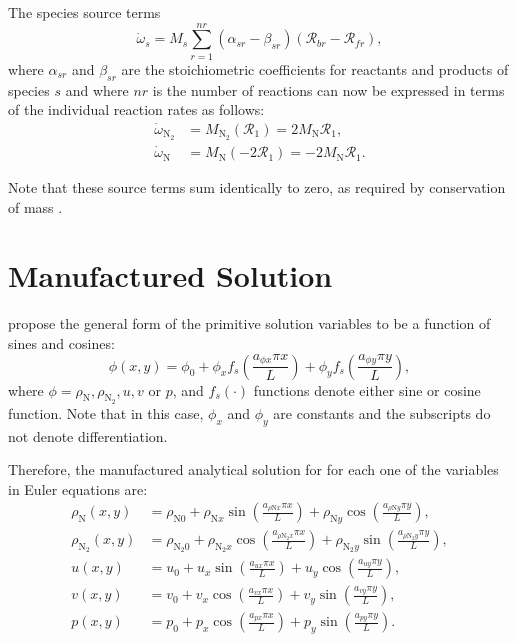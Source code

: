 \documentclass[10pt]{article}
\begin{document}
The species source terms \begin{equation}
  \dot{\omega}_s = M_s \sum_{r=1}^{nr}\left(\alpha_{sr}-\beta_{sr}\right)\left(\mathcal{R}_{br} - \mathcal{R}_{fr}\right),
\end{equation}
where $\alpha_{sr}$ and $\beta_{sr}$ are the stoichiometric coefficients for reactants and products of species $s$ and where $nr$ is the number of reactions can now be expressed in terms of the individual reaction rates as follows:
\begin{align*}
 \dot{\omega}_{\text{N}_2} &= M_{\text{N}_2}\left(\mathcal{R}_1\right)= 2 M_\text{N} \mathcal{R}_1 ,\\
 \dot{\omega}_{\text{N}} &= M_{\text{N}}\left(-2\mathcal{R}_1 \right)=-2 M_\text{N} \mathcal{R}_1. 
\end{align*}

Note that these source terms sum identically to zero, as required by conservation of mass  \citep{Kessler2004}.


\section{Manufactured Solution}

\citet{Roy2002} propose the general form of the primitive solution variables to be a function of sines and cosines:
\begin{equation}
 \label{eq:manufactured01}
 \phi (x,y) = \phi_0+ \phi_x f_s\left(\frac{a_{\phi x} \pi x}{L}\right) + \phi_y f_s\left(\frac{a_{\phi y} \pi y}{L}\right),
\end{equation}
where $\phi=\rho_{\text{N}},\rho_{\text{N}_2}, u,v$ or $p$, and $f_s(\cdot)$ functions denote either sine or cosine function. Note that in this case, $\phi_x$ and $\phi_y$ are constants and the subscripts do not denote differentiation.

Therefore, the manufactured analytical solution for for each one of the variables in Euler equations are:
\begin{equation}
\begin{split}
\label{eq:manufactured02}
\rho_{\text{N}}\left(x,y\right) &= \rho_{\text{N}0} + \rho_{\text{N}x} \sin\left(\frac{a_{  \rho \text{N} x }\pi x}{L}\right)+ \rho_{\text{N} y} \cos\left(\frac{a_{  \rho \text{N} y} \pi y}{L}\right),\\
\rho_{\text{N}_2}\left(x,y\right) &= \rho_{\text{N}_2 0}+ \rho_{\text{N}_2 x} \cos\left(\frac{a_{ \rho \text{N}_2 x } \pi x}{L}\right)+ \rho_{\text{N}_2 y} \sin\left(\frac{a_{ \rho \text{N}_2 y } \pi y}{L}\right),\\
u\left(x,y\right) &= u_{0}+u_{x} \sin\left(\frac{a_{u x} \pi x}{L}\right)+u_{y} \cos\left(\frac{a_{u y} \pi y}{L}\right),\\
v\left(x,y\right) &= v_{0}+v_{x} \cos\left(\frac{a_{v x} \pi x}{L}\right)+v_{y} \sin\left(\frac{a_{v y} \pi y}{L}\right),\\
p\left(x,y\right) &= p_{0}+p_{x} \cos\left(\frac{a_{p x} \pi x}{L}\right)+p_{y} \sin\left(\frac{a_{p y} \pi y}{L}\right).\\
\end{split}
\end{equation}
\end{document}
